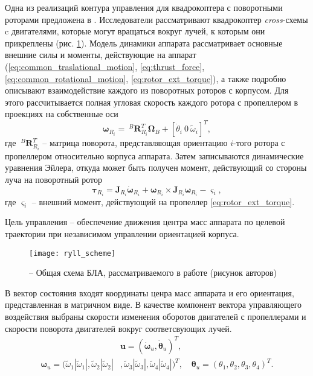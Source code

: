 Одна из реализаций контура управления для квадрокоптера с поворотными роторами предложена в \cite{Ryll01}. Исследователи рассматривают квадрокоптер \textit{cross}-схемы c двигателями, которые могут вращаться вокруг лучей, к которым они прикреплены (рис. \ref{fig:ryll_scheme}). Модель динамики аппарата рассматривает основные внешние силы и моменты, действующие на аппарат (\ref{eq:common_traslational_motion}, \ref{eq:thrust_force}, \ref{eq:common_rotational_motion}, \ref{eq:rotor_ext_torque}), а также подробно описывают взаимодействие каждого из поворотных роторов с корпусом. Для этого рассчитывается полная угловая скорость каждого ротора с пропеллером в проекциях на собственные оси
\begin{equation}
\bm{\omega}_{R_i} = ~^B\bm{R}_{R_i}^T \bm \Omega_B + [\dot{\theta}_i \ 0 \ \tilde \omega_i]^T,
\end{equation}
где $~^B\bm{R}_{R_i}^T$ -- матрица поворота, представляющая ориентацию $i$-того ротора с пропеллером
относительно корпуса аппарата.
Затем записываются динамические уравнения Эйлера, откуда может быть получен момент, действующий со стороны луча на поворотный ротор
\begin{equation}
\bm{\tau}_{R_i} = \bm J_{R_i} \dot{\bm \omega}_{R_i} +
{\bm \omega}_{R_i} \times \bm J_{R_i} {\bm \omega}_{R_i} - \bm \varsigma_i,
\end{equation}
где $\bm \varsigma_i$ -- внешний момент, действующий на пропеллер \eqref{eq:rotor_ext_torque}.

Цель управления -- обеспечение движения центра масс аппарата по целевой траектории при независимом управлении ориентацией корпуса. 
\begin{figure}[h!]
	\centering
	\texttt{[image: ryll\_scheme]}
	\caption{ -- Общая схема БЛА, рассматриваемого в работе \cite{Ryll01} (рисунок авторов)}
 	\label{fig:ryll_scheme}
\end{figure}

В вектор состояния входят координаты ценра масс аппарата и его ориентация, представленная в матричном виде.
В качестве компонент вектора управляющего воздействия выбраны скорости изменения оборотов двигателей с пропеллерами и скорости поворота двигателей вокруг соответсвующих лучей.
\begin{equation} \label{eq:ryll_ctrl_out}
\begin{aligned}
&\bm{u} = (\dot{\bm \omega}_u,  \dot{\bm \theta}_u)^T,
\\
\bm \omega_u =
(\tilde\omega_1 |\tilde\omega_1|,
\tilde\omega_2 |\tilde\omega_2|&,
\tilde\omega_3 |\tilde\omega_3|,
\tilde\omega_4 |\tilde\omega_4|)^T,
\quad
{\bm \theta}_u = (\theta_1, \theta_2 , \theta_3 , \theta_4 )^T.
\end{aligned}
\end{equation}

